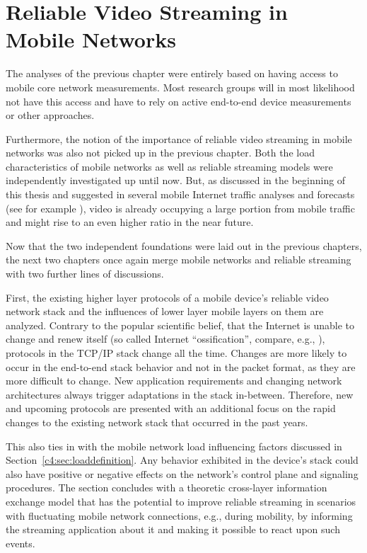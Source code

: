 \chapter{Reliable Video Streaming in Mobile Networks}
\label{chap:mobilestreaming}

The analyses of the previous chapter were entirely based on having access to mobile core network measurements. Most research groups will in most likelihood not have this access and have to rely on active end-to-end device measurements or other approaches.

Furthermore, the notion of the importance of reliable video streaming in mobile networks was also not picked up in the previous chapter. Both the load characteristics of mobile networks as well as reliable streaming models were independently investigated up until now. But, as discussed in the beginning of this thesis and suggested in several mobile Internet traffic analyses and forecasts (see for example \cite{cisco2014VNI}), video is already occupying a large portion from mobile traffic and might rise to an even higher ratio in the near future.

Now that the two independent foundations were laid out in the previous chapters, the next two chapters once again merge mobile networks and reliable streaming with two further lines of discussions. 

First, the existing higher layer protocols of a mobile device's reliable video network stack and the influences of lower layer mobile layers on them are analyzed. Contrary to the popular scientific belief, that the Internet is unable to change and renew itself (so called Internet ``ossification'', compare, e.g., \cite{feldmann2010ossification}), protocols in the \gls{TCP}/\gls{IP} stack change all the time. Changes are more likely to occur in the end-to-end stack behavior and not in the packet format, as they are more difficult to change. New application requirements and changing network architectures always trigger adaptations in the stack in-between. Therefore, new and upcoming protocols are presented with an additional focus on the rapid changes to the existing network stack that occurred in the past years.

This also ties in with the mobile network load influencing factors discussed in Section~\ref{c4:sec:loaddefinition}. Any behavior exhibited in the device's stack could also have positive or negative effects on the network's control plane and signaling procedures. The section concludes with a theoretic cross-layer information exchange model that has the potential to improve reliable streaming in scenarios with fluctuating mobile network connections, e.g., during mobility, by informing the streaming application about it and making it possible to react upon such events.

